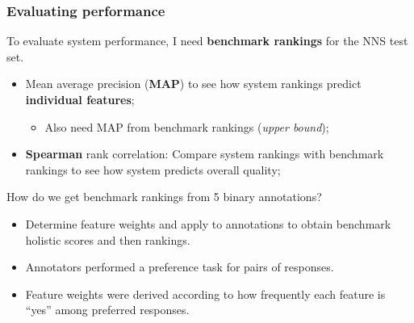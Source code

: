 \documentclass[xcolor={dvipsnames}]{beamer}
\begin{document}
\begin{frame}
\frametitle{Evaluating performance}

To evaluate system performance, I need \textbf{benchmark rankings} for the NNS test set. \\

\begin{itemize}
\pause
\item Mean average precision (\textbf{MAP}) to see how system rankings predict \textbf{individual features};
\begin{itemize}
\item Also need MAP from benchmark rankings (\textit{upper bound});
\end{itemize}

\pause
\item \textbf{Spearman} rank correlation: Compare system rankings with benchmark rankings to see how system predicts overall quality;
\end{itemize}

\pause
How do we get benchmark rankings from 5 binary annotations? \\

\pause
\begin{itemize}
\item Determine feature weights and apply to annotations to obtain benchmark holistic scores and then rankings.
\pause
\item Annotators performed a preference task for pairs of responses.
\pause
\item Feature weights were derived according to how frequently each feature is ``yes'' among preferred responses. 
\end{itemize}
\end{frame}
\end{document}
